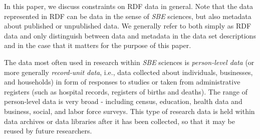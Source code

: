 \documentclass{llncs}
\begin{document}
In this paper, we discuss constraints on RDF data in general. Note that the data represented in RDF can be data in the sense of \emph{SBE} sciences, but also metadata about published or unpublished data. We generally refer to both simply as RDF data and only distinguish between data and metadata in the data set descriptions and in the case that it matters for the purpose of this paper.



The data most often used in research within \emph{SBE} sciences is \emph{person-level data} (or more generally \emph{record-unit data}, i.e., data collected about individuals, businesses, and households) in form of responses to studies or taken from administrative registers
(such as hospital records, registers of births and deaths). 
The range of person-level data is very broad - 
including census, education, health data and business, social, and labor force surveys.  
This type of research data is
held within data archives or data libraries after it has been collected, so that it may be
reused by future researchers. 
\end{document}
